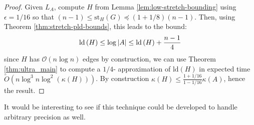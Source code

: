 \begin{proof}
Given $L_{A}$, compute $H$ from Lemma \ref{lem:low-stretch-bounding}
using $\epsilon=1/16$ so that $\left(n-1\right)\leq\text{st}_{H}\left(G\right)\preceq\left(1+1/8\right)\left(n-1\right)$.
Then, using Theorem \ref{thm:stretch-pld-bounds}, this leads to the
bound: 
\[
\text{\text{ld}}\left(H\right)\leq\log\left|A\right|\leq\text{ld}\left(H\right)+\frac{n-1}{4}
\]
since $H$ has $\mathcal{O}\left(n\log n\right)$ edges by construction,
we can use Theorem \ref{thm:ultra_main} to compute a $1/4$- approximation
of $\text{ld}\left(H\right)$ in expected time $\tilde{O}\left(n\log^{3}n\log^{2}\left(\kappa(H)\right)\right)$.
By construction $\kappa(H)\leq\frac{1+1/16}{1-1/16}\kappa(A)$, hence
the result.
\end{proof}
It would be interesting to see if this technique could be developed
to handle arbitrary precision as well. 
